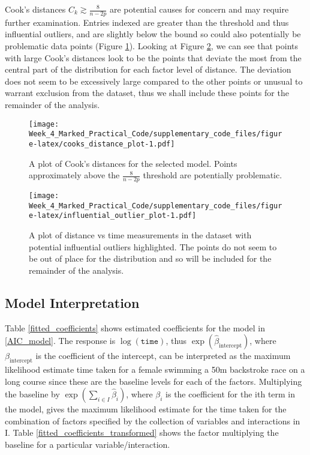 \documentclass[a4paper,11pt]{article}
\begin{document}
Cook's distances $C_k \gtrsim \frac{8}{n - 2p}$ are potential causes for concern and may require further examination. Entries indexed \savedvstext[2,2] are greater than the threshold and thus influential outliers, and \savedvstext[3,2] are slightly below the bound so could also potentially be problematic data points (Figure \ref{cooks_distances}). Looking at Figure \ref{influential_outlier_plot}, we can see that points with large Cook's distances look to be the points that deviate the most from the central part of the distribution for each factor level of distance. The deviation does not seem to be excessively large compared to the other points or unusual to warrant exclusion from the dataset, thus we shall include these points for the remainder of the analysis.

\begin{figure}
  \centering
  \texttt{[image: Week\_4\_Marked\_Practical\_Code/supplementary\_code\_files/figure-latex/cooks\_distance\_plot-1.pdf]}
  \caption{A plot of Cook's distances for the selected model. Points approximately above the $\frac{8}{n - 2p}$ threshold are potentially problematic.}
  \label{cooks_distances}
\end{figure}

\begin{figure}
  \centering
  \texttt{[image: Week\_4\_Marked\_Practical\_Code/supplementary\_code\_files/figure-latex/influential\_outlier\_plot-1.pdf]}
  \caption{A plot of distance vs time measurements in the dataset with potential influential outliers highlighted. The points do not seem to be out of place for the distribution and so will be included for the remainder of the analysis.}
  \label{influential_outlier_plot}
\end{figure}

\subsection{Model Interpretation}

Table \ref{fitted_coefficients} shows estimated coefficients for the model in \eqref{AIC_model}. The response is $\log(\texttt{time})$, thus $\exp(\hat{\beta}_\text{intercept})$, where $\beta_\text{intercept}$ is the coefficient of the intercept, can be interpreted as the maximum likelihood estimate time taken for a female swimming a 50m backstroke race on a long course since these are the baseline levels for each of the factors. Multiplying the baseline by $\exp(\sum_{i \in I} \hat{\beta}_i)$, where $\beta_i$ is the coefficient for the ith term in the model, gives the maximum likelihood estimate for the time taken for the combination of factors specified by the collection of variables and interactions in I. Table \ref{fitted_coefficients_transformed} shows the factor multiplying the baseline for a particular variable/interaction.
\end{document}
